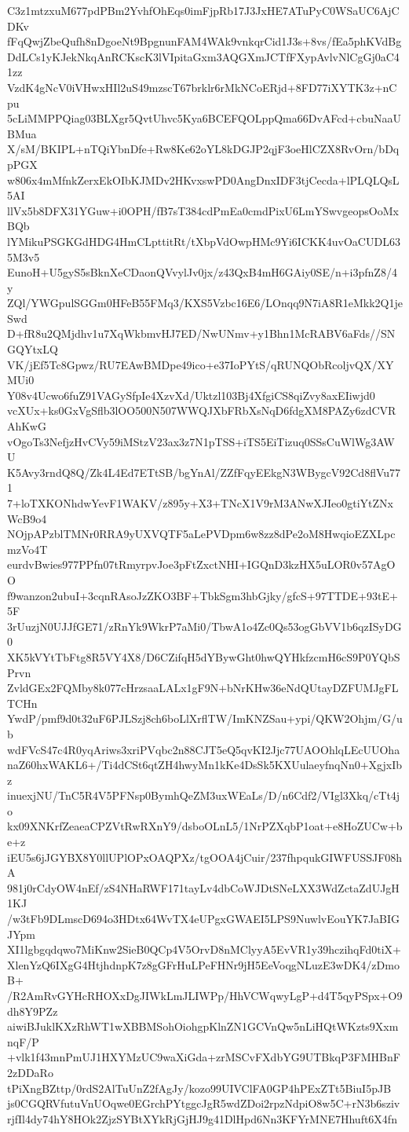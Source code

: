 C3z1mtzxuM677pdPBm2YvhfOhEqs0imFjpRb17J3JxHE7ATuPyC0WSaUC6AjCDKv
fFqQwjZbeQufh8nDgoeNt9BpgnunFAM4WAk9vnkqrCid1J3s+8vs/fEa5phKVdBg
DdLCs1yKJekNkqAnRCKscK3lVIpitaGxm3AQGXmJCTfFXypAvlvNlCgGj0aC41zz
VzdK4gNcV0iVHwxHIl2uS49mzscT67brklr6rMkNCoERjd+8FD77iXYTK3z+nCpu
5cLiMMPPQiag03BLXgr5QvtUhvc5Kya6BCEFQOLppQma66DvAFcd+cbuNaaUBMua
X/sM/BKIPL+nTQiYbnDfe+Rw8Ke62oYL8kDGJP2qjF3oeHlCZX8RvOrn/bDqpPGX
w806x4mMfnkZerxEkOIbKJMDv2HKvxswPD0AngDnxIDF3tjCecda+lPLQLQsL5AI
llVx5b8DFX31YGuw+i0OPH/fB7sT384cdPmEa0cmdPixU6LmYSwvgeopsOoMxBQb
lYMikuPSGKGdHDG4HmCLpttitRt/tXbpVdOwpHMc9Yi6ICKK4uvOaCUDL635M3v5
EunoH+U5gyS5sBknXeCDaonQVvylJv0jx/z43QxB4mH6GAiy0SE/n+i3pfnZ8/4y
ZQl/YWGpulSGGm0HFeB55FMq3/KXS5Vzbc16E6/LOnqq9N7iA8R1eMkk2Q1jeSwd
D+fR8u2QMjdhv1u7XqWkbmvHJ7ED/NwUNmv+y1Bhn1McRABV6aFds//SNGQYtxLQ
VK/jEf5Tc8Gpwz/RU7EAwBMDpe49ico+e37IoPYtS/qRUNQObRcoljvQX/XYMUi0
Y08v4Ucwo6fuZ91VAGySfpIe4XzvXd/Uktzl103Bj4XfgiCS8qiZvy8axEIiwjd0
vcXUx+ks0GxVgSflb3lOO500N507WWQJXbFRbXsNqD6fdgXM8PAZy6zdCVRAhKwG
vOgoTs3NefjzHvCVy59iMStzV23ax3z7N1pTSS+iTS5EiTizuq0SSsCuWlWg3AWU
K5Avy3rndQ8Q/Zk4L4Ed7ETtSB/bgYnAl/ZZfFqyEEkgN3WBygcV92Cd8flVu771
7+loTXKONhdwYevF1WAKV/z895y+X3+TNcX1V9rM3ANwXJIeo0gtiYtZNxWcB9o4
NOjpAPzblTMNr0RRA9yUXVQTF5aLePVDpm6w8zz8dPe2oM8HwqioEZXLpcmzVo4T
eurdvBwies977PPfn07tRmyrpvJoe3pFtZxctNHI+IGQnD3kzHX5uLOR0v57AgOO
f9wanzon2ubuI+3cqnRAsoJzZKO3BF+TbkSgm3hbGjky/gfcS+97TTDE+93tE+5F
3rUuzjN0UJJfGE71/zRnYk9WkrP7aMi0/TbwA1o4Zc0Qs53ogGbVV1b6qzISyDG0
XK5kVYtTbFtg8R5VY4X8/D6CZifqH5dYBywGht0hwQYHkfzcmH6cS9P0YQbSPrvn
ZvldGEx2FQMby8k077cHrzsaaLALx1gF9N+bNrKHw36eNdQUtayDZFUMJgFLTCHn
YwdP/pmf9d0t32uF6PJLSzj8ch6boLlXrflTW/ImKNZSau+ypi/QKW2Ohjm/G/ub
wdFVcS47c4R0yqAriws3xriPVqbc2n88CJT5eQ5qvKI2Jjc77UAOOhlqLEcUUOha
naZ60hxWAKL6+/Ti4dCSt6qtZH4hwyMn1kKe4DsSk5KXUulaeyfnqNn0+XgjxIbz
inuexjNU/TnC5R4V5PFNsp0BymhQeZM3uxWEaLs/D/n6Cdf2/VIgl3Xkq/cTt4jo
kx09XNKrfZeaeaCPZVtRwRXnY9/dsboOLnL5/1NrPZXqbP1oat+e8HoZUCw+be+z
iEU5s6jJGYBX8Y0llUPlOPxOAQPXz/tgOOA4jCuir/237fhpqukGIWFUSSJF08hA
981j0rCdyOW4nEf/zS4NHaRWF171tayLv4dbCoWJDtSNeLXX3WdZctaZdUJgH1KJ
/w3tFb9DLmscD694o3HDtx64WvTX4eUPgxGWAEI5LPS9NuwlvEouYK7JaBIGJYpm
XI1lgbgqdqwo7MiKnw2SieB0QCp4V5OrvD8nMClyyA5EvVR1y39hczihqFd0tiX+
XlenYzQ6IXgG4HtjhdnpK7z8gGFrHuLPeFHNr9jH5EeVoqgNLuzE3wDK4/zDmoB+
/R2AmRvGYHcRHOXxDgJIWkLmJLIWPp/HhVCWqwyLgP+d4T5qyPSpx+O9dh8Y9PZz
aiwiBJuklKXzRhWT1wXBBMSohOiohgpKlnZN1GCVnQw5nLiHQtWKzts9XxmnqF/P
+vlk1f43mnPmUJ1HXYMzUC9waXiGda+zrMSCvFXdbYG9UTBkqP3FMHBnF2zDDaRo
tPiXngBZttp/0rdS2AlTuUnZ2fAgJy/kozo99UIVClFA0GP4hPExZTt5BiuI5pJB
js0CGQRVfutuVnUOqwe0EGrchPYtggcJgR5wdZDoi2rpzNdpiO8w5C+rN3b6sziv
rjfIl4dy74hY8HOk2ZjzSYBtXYkRjGjHJ9g41DlHpd6Nn3KFYrMNE7Hhuft6X4fn
